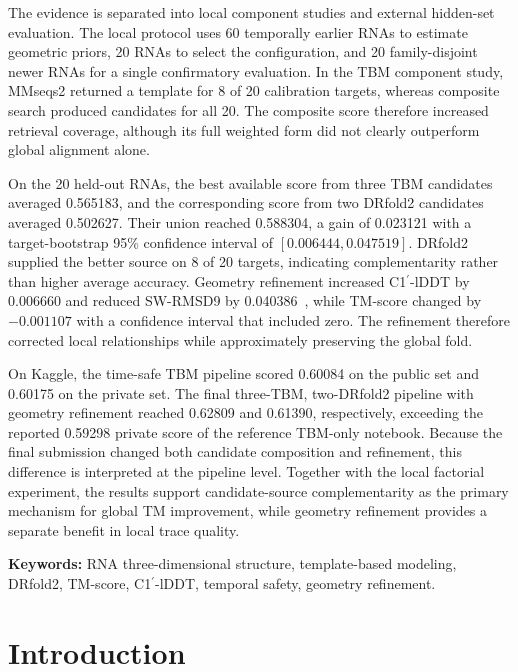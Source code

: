 \documentclass[12pt,a4paper,oneside]{report}
\newcommand{\cprime}{C1$^{\prime}$}
\newcommand{\angstrom}{\text{\AA}}
\begin{document}
The evidence is separated into local component studies and external hidden-set
evaluation. The local protocol uses 60 temporally earlier RNAs to estimate geometric
priors, 20 RNAs to select the configuration, and 20 family-disjoint newer RNAs for a
single confirmatory evaluation. In the TBM component study, MMseqs2 returned a template
for 8 of 20 calibration targets, whereas composite search produced candidates for all
20. The composite score therefore increased retrieval coverage, although its full
weighted form did not clearly outperform global alignment alone.

On the 20 held-out RNAs, the best available score from three TBM candidates averaged
0.565183, and the corresponding score from two DRfold2 candidates averaged 0.502627.
Their union reached 0.588304, a gain of 0.023121 with a target-bootstrap 95\% confidence
interval of $[0.006444,0.047519]$. DRfold2 supplied the better source on 8 of 20 targets,
indicating complementarity rather than higher average accuracy. Geometry refinement
increased \cprime{}-lDDT by 0.006660 and reduced SW-RMSD9 by 0.040386~\angstrom{}, while
TM-score changed by $-0.001107$ with a confidence interval that included zero. The
refinement therefore corrected local relationships while approximately preserving the
global fold.

On Kaggle, the time-safe TBM pipeline scored 0.60084 on the public set and 0.60175 on the
private set. The final three-TBM, two-DRfold2 pipeline with geometry refinement reached
0.62809 and 0.61390, respectively, exceeding the reported 0.59298 private score of the
reference TBM-only notebook. Because the final submission changed both candidate
composition and refinement, this difference is interpreted at the pipeline level.
Together with the local factorial experiment, the results support candidate-source
complementarity as the primary mechanism for global TM improvement, while geometry
refinement provides a separate benefit in local trace quality.

\noindent\textbf{Keywords:} RNA three-dimensional structure, template-based modeling,
DRfold2, TM-score, \cprime{}-lDDT, temporal safety, geometry refinement.

\tableofcontents
\listoftables
\listoffigures
\clearpage
{}

\chapter{Introduction}
\label{chap:intro_en}
\end{document}
